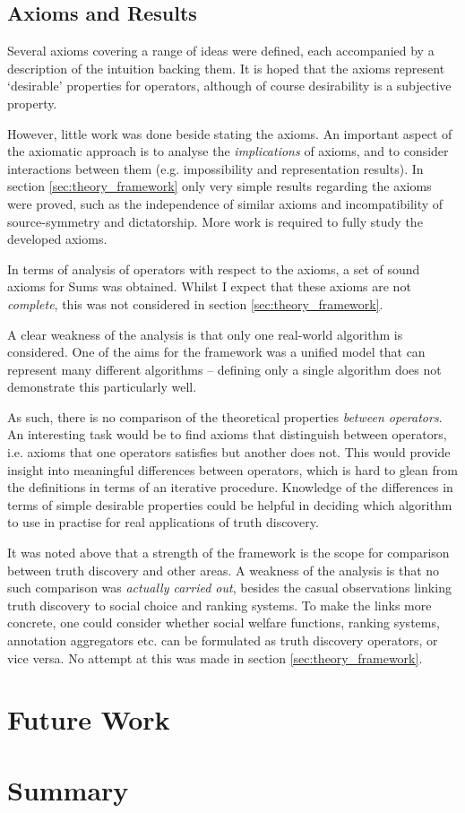 \documentclass[../main.tex]{subfiles}
\begin{document}
\subsection*{Axioms and Results}

Several axioms covering a range of ideas were defined, each accompanied by a
description of the intuition backing them. It is hoped that the axioms
represent `desirable' properties for operators, although of course desirability
is a subjective property.

However, little work was done beside stating the axioms. An important aspect
of the axiomatic approach is to analyse the \emph{implications} of axioms, and
to consider interactions between them (e.g. impossibility and representation
results). In section \ref{sec:theory_framework} only very simple results
regarding the axioms were proved, such as the independence of similar axioms
and incompatibility of source-symmetry and dictatorship. More work is required
to fully study the developed axioms.

In terms of analysis of operators with respect to the axioms, a set of sound
axioms for Sums was obtained. Whilst I expect that these axioms are not
\emph{complete}, this was not considered in section \ref{sec:theory_framework}.

A clear weakness of the analysis is that only one real-world algorithm is
considered. One of the aims for the framework was a unified model that can
represent many different algorithms -- defining only a single algorithm does
not demonstrate this particularly well.

As such, there is no comparison of the theoretical properties \emph{between
operators}. An interesting task would be to find axioms that distinguish
between operators, i.e. axioms that one operators satisfies but another does
not. This would provide insight into meaningful differences between operators,
which is hard to glean from the definitions in terms of an iterative procedure.
Knowledge of the differences in terms of simple desirable properties could be
helpful in deciding which algorithm to use in practise for real applications of
truth discovery.

It was noted above that a strength of the framework is the scope for comparison
between truth discovery and other areas. A weakness of the analysis is that no
such comparison was \emph{actually carried out}, besides the casual
observations linking truth discovery to social choice and ranking systems. To
make the links more concrete, one could consider whether social welfare
functions, ranking systems, annotation aggregators etc. can be formulated as
truth discovery operators, or vice versa. No attempt at this was made in
section \ref{sec:theory_framework}.

\section{Future Work}

\section{Summary}
\end{document}
